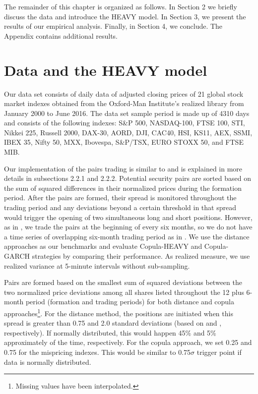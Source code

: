 \documentclass[a4paper,12pt]{report}
\begin{document}
The remainder of this chapter is organized as follows. In Section 2 we briefly discuss the data and introduce the HEAVY model. In Section 3, we present the results of our empirical analysis. Finally, in Section 4, we conclude. The Appendix contains additional results.

\vspace{0.6cm}

\section{Data and the HEAVY model}
\label{section2}

Our data set consists of daily data of adjusted closing prices of 21 global stock market indexes obtained from the Oxford-Man Institute's realized library from January 2000 to June 2016. The data set sample period is made up of 4310 days and consists of the following indexes: S\&P 500, NASDAQ-100, FTSE 100, STI, Nikkei 225, Russell 2000, DAX-30, AORD, DJI, CAC40, HSI, KS11, AEX, SSMI, IBEX 35, Nifty 50, MXX, Ibovespa, S\&P/TSX, EURO STOXX 50, and FTSE MIB.

Our implementation of the pairs trading is similar to \citet*{ggr06} and is explained in more details in subsections 2.2.1 and 2.2.2. Potential security pairs are sorted based on the sum of squared differences in their normalized prices during the formation period. After the pairs are formed, their spread is monitored throughout the trading period and any deviations beyond a certain threshold in that spread would trigger the opening of two simultaneous long and short positions. However, as in \citet*{bv12}, we trade the pairs at the beginning of every six months, so we do not have a time series of overlapping six-month trading period as in \citet*{ggr06}. We use the distance approaches as our benchmarks and evaluate Copula-HEAVY and Copula-GARCH strategies by comparing their performance. As realized measure, we use realized variance at 5-minute intervals without sub-sampling.

Pairs are formed based on the smallest sum of squared deviations between the two normalized price deviations among all shares listed throughout the 12 plus 6-month period (formation and trading periods) for both distance and copula approaches\footnote{%
	Missing values have been interpolated.}. For the distance method, the positions are initiated when this spread is greater than 0.75 and 2.0 standard deviations (based on \citet*{v04} and \citet*{ggr06}, respectively). If normally distributed, this would happen 45\% and 5\% approximately of the time, respectively. For the copula approach, we set 0.25 and 0.75 for the mispricing indexes. This would be similar to 0.75$\sigma$ trigger point if data is normally distributed.
\end{document}
